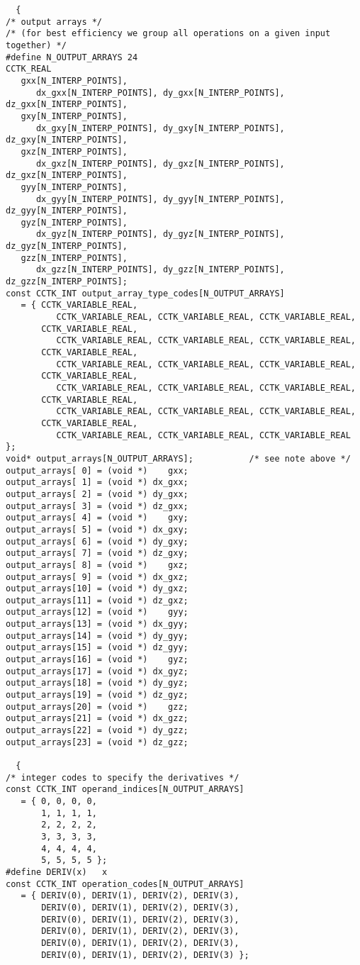 \begin{verbatim}
  {
/* output arrays */
/* (for best efficiency we group all operations on a given input together) */
#define N_OUTPUT_ARRAYS 24
CCTK_REAL
   gxx[N_INTERP_POINTS],
      dx_gxx[N_INTERP_POINTS], dy_gxx[N_INTERP_POINTS], dz_gxx[N_INTERP_POINTS],
   gxy[N_INTERP_POINTS],
      dx_gxy[N_INTERP_POINTS], dy_gxy[N_INTERP_POINTS], dz_gxy[N_INTERP_POINTS],
   gxz[N_INTERP_POINTS],
      dx_gxz[N_INTERP_POINTS], dy_gxz[N_INTERP_POINTS], dz_gxz[N_INTERP_POINTS],
   gyy[N_INTERP_POINTS],
      dx_gyy[N_INTERP_POINTS], dy_gyy[N_INTERP_POINTS], dz_gyy[N_INTERP_POINTS],
   gyz[N_INTERP_POINTS],
      dx_gyz[N_INTERP_POINTS], dy_gyz[N_INTERP_POINTS], dz_gyz[N_INTERP_POINTS],
   gzz[N_INTERP_POINTS],
      dx_gzz[N_INTERP_POINTS], dy_gzz[N_INTERP_POINTS], dz_gzz[N_INTERP_POINTS];
const CCTK_INT output_array_type_codes[N_OUTPUT_ARRAYS]
   = { CCTK_VARIABLE_REAL,
          CCTK_VARIABLE_REAL, CCTK_VARIABLE_REAL, CCTK_VARIABLE_REAL,
       CCTK_VARIABLE_REAL,
          CCTK_VARIABLE_REAL, CCTK_VARIABLE_REAL, CCTK_VARIABLE_REAL,
       CCTK_VARIABLE_REAL,
          CCTK_VARIABLE_REAL, CCTK_VARIABLE_REAL, CCTK_VARIABLE_REAL,
       CCTK_VARIABLE_REAL,
          CCTK_VARIABLE_REAL, CCTK_VARIABLE_REAL, CCTK_VARIABLE_REAL,
       CCTK_VARIABLE_REAL,
          CCTK_VARIABLE_REAL, CCTK_VARIABLE_REAL, CCTK_VARIABLE_REAL,
       CCTK_VARIABLE_REAL,
          CCTK_VARIABLE_REAL, CCTK_VARIABLE_REAL, CCTK_VARIABLE_REAL };
void* output_arrays[N_OUTPUT_ARRAYS];           /* see note above */
output_arrays[ 0] = (void *)    gxx;
output_arrays[ 1] = (void *) dx_gxx;
output_arrays[ 2] = (void *) dy_gxx;
output_arrays[ 3] = (void *) dz_gxx;
output_arrays[ 4] = (void *)    gxy;
output_arrays[ 5] = (void *) dx_gxy;
output_arrays[ 6] = (void *) dy_gxy;
output_arrays[ 7] = (void *) dz_gxy;
output_arrays[ 8] = (void *)    gxz;
output_arrays[ 9] = (void *) dx_gxz;
output_arrays[10] = (void *) dy_gxz;
output_arrays[11] = (void *) dz_gxz;
output_arrays[12] = (void *)    gyy;
output_arrays[13] = (void *) dx_gyy;
output_arrays[14] = (void *) dy_gyy;
output_arrays[15] = (void *) dz_gyy;
output_arrays[16] = (void *)    gyz;
output_arrays[17] = (void *) dx_gyz;
output_arrays[18] = (void *) dy_gyz;
output_arrays[19] = (void *) dz_gyz;
output_arrays[20] = (void *)    gzz;
output_arrays[21] = (void *) dx_gzz;
output_arrays[22] = (void *) dy_gzz;
output_arrays[23] = (void *) dz_gzz;

  {
/* integer codes to specify the derivatives */
const CCTK_INT operand_indices[N_OUTPUT_ARRAYS]
   = { 0, 0, 0, 0,
       1, 1, 1, 1,
       2, 2, 2, 2,
       3, 3, 3, 3,
       4, 4, 4, 4,
       5, 5, 5, 5 };
#define DERIV(x)   x
const CCTK_INT operation_codes[N_OUTPUT_ARRAYS]
   = { DERIV(0), DERIV(1), DERIV(2), DERIV(3),
       DERIV(0), DERIV(1), DERIV(2), DERIV(3),
       DERIV(0), DERIV(1), DERIV(2), DERIV(3),
       DERIV(0), DERIV(1), DERIV(2), DERIV(3),
       DERIV(0), DERIV(1), DERIV(2), DERIV(3),
       DERIV(0), DERIV(1), DERIV(2), DERIV(3) };


\end{verbatim}

